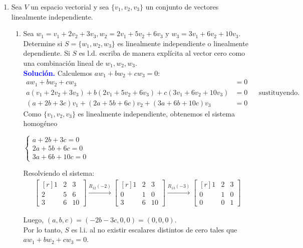 \documentclass[11pt]{article}
\newcommand{\solution}{\textcolor{blue}{\textbf{Solución. }}}
\begin{document}
\begin{enumerate}
	\item Sea $V$ un espacio vectorial y sea $\{v_1,v_2,v_3\}$ un conjunto de vectores linealmente independiente. 
	\begin{enumerate}
		\item Sea $w_1=v_1 + 2v_2 + 3v_3, w_2=2v_1 + 5v_2 + 6v_3$ y $w_3=3v_1 + 6v_2 + 10v_3$. Determine si $S=\{w_1,w_2,w_3\}$ es linealmente independiente o linealmente dependiente. Si $S$ es l.d. escriba de manera explícita al vector cero como una combinación lineal de $w_1,w_2,w_3$. \\
		\solution Calculemos $aw_1 + bw_2 + cw_3 = 0$:
		\begin{align*}
				   aw_1 + bw_2 + cw_3 &= 0 \\
				   a(v_1 + 2v_2 + 3v_3) + b(2v_1 + 5v_2 + 6v_3) + c(3v_1 + 6v_2 + 10v_3) &= 0 && \text{sustituyendo}.\\
				   (a+2b+3c)v_1 + (2a+5b+6c)v_2 + (3a+6b+10c)v_3  &= 0
		\end{align*} 
		Como $\{v_1,v_2,v_3\}$ es linealmente independiente, obtenemos el sistema homogéneo
		\begin{center}
		    $\begin{cases}
					a+2b+3c = 0 \\
				   2a+5b+6c = 0 \\
				   3a+6b+10c = 0
		    \end{cases}$
		\end{center}
		
		Resolviendo el sistema:
		\begin{gather*}
		    \begin{bmatrix*}[r]
		        1 & 2 & 3 \\ 
		        2 & 5 & 6 \\ 
		        3 & 6 & 10
		    \end{bmatrix*} \xrightarrow{R_{12}(-2)} 
		    \begin{bmatrix*}[r]
		        1 & 2 & 3 \\ 
		        0 & 1 & 0 \\ 
		        3 & 6 & 10
		    \end{bmatrix*} \xrightarrow{R_{13}(-3)} 
		    \begin{bmatrix*}[r]
		        1 & 2 & 3 \\ 
		        0 & 1 & 0 \\ 
		        0 & 0 & 1
            \end{bmatrix*}
		\end{gather*}
		
		Luego, $(a,b,c) = (-2b-3c,0,0)=(0,0,0)$. \\
		Por lo tanto, $S$ es l.i. al no existir escalares distintos de cero tales que $aw_1 + bw_2 + cw_3 = 0$.
		

\end{enumerate}
\end{enumerate}
\end{document}
